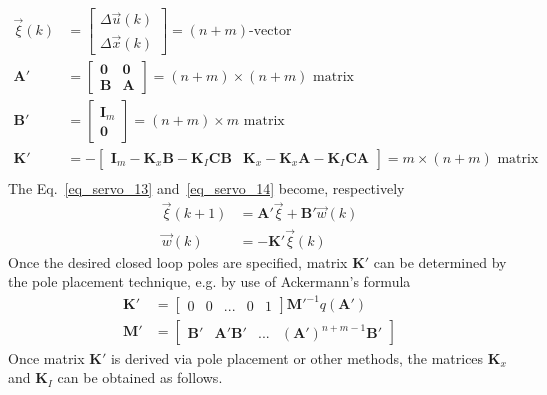 \documentclass[12pt,a4paper,oneside]{book}
\begin{document}
\begin{onehalfspace}
\begin{equation*}
\begin{aligned}
		\vec{\xi}(k) &= 
		\begin{bmatrix}
			\Delta\vec{u}(k) \\[6pt]  
			\Delta\vec{x}(k)
		\end{bmatrix} = \text{$(n+m)$-vector} \\[6pt]
		\mathbf{A'} &= 
		\begin{bmatrix}
			\mathbf{0} & \mathbf{0} \\[6pt]  
			\mathbf{B} & \mathbf{A}
		\end{bmatrix} = \text{$(n+m)\times(n+m)$ matrix} \\[6pt]
		\mathbf{B'} &= 
		\begin{bmatrix}
			\mathbf{I}_m \\[6pt]  
			\mathbf{0}
		\end{bmatrix}= \text{$(n+m)\times m$ matrix} \\[6pt] 
		\mathbf{K'} &= -
		\begin{bmatrix}
			\mathbf{I}_m-\mathbf{K}_x\mathbf{B}-\mathbf{K}_I\mathbf{C}\mathbf{B}
			&  
			\mathbf{K}_x-\mathbf{K}_x\mathbf{A}-\mathbf{K}_I\mathbf{C}\mathbf{A}
		\end{bmatrix}= \text{$m \times (n+m)$ matrix} \\[6pt] 
	\end{aligned}
\end{equation*}
The Eq.~\eqref{eq_servo_13} and~\eqref{eq_servo_14} become, respectively
\begin{equation}\label{eq_servo_15}
	\begin{aligned}
		\vec{\xi}(k+1) &= \mathbf{A'}\vec{\xi}+\mathbf{B'}\vec{w}(k) \\[6pt] 
		\vec{w}(k) &= -\mathbf{K'}\vec{\xi}(k)
	\end{aligned}
\end{equation}
Once the desired closed loop poles are specified, matrix $\mathbf{K'}$ can be 
determined by the pole placement technique, e.g. by use of Ackermann's formula
\begin{equation*}
	\begin{aligned}
		\mathbf{K'} &= \begin{bmatrix} 0&0&...&0&1 \end{bmatrix} 
		\mathbf{M'}^{-1}q(\mathbf{A'}) \\[6pt]
		\mathbf{M'} &= \begin{bmatrix} 
			\mathbf{B'}&\mathbf{A'}\mathbf{B'}&...&\left( \mathbf{A'}\right) 
			^{n+m-1}\mathbf{B'} \end{bmatrix}
	\end{aligned}
\end{equation*}
Once matrix $\mathbf{K'}$ is derived via pole placement or other methods, the matrices $\mathbf{K}_x$ and 
$\mathbf{K}_I$ can be obtained as follows.


\end{onehalfspace}
\end{document}
